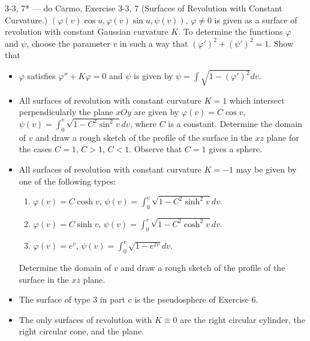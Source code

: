 \begin{exercise}{3-3, 7* — do Carmo, Exercise 3-3, 7}
(Surfaces of Revolution with Constant Curvature.) $(\varphi(v) \cos u, \varphi(v) \sin u, \psi(v))$, $\varphi \neq 0$ is given as a surface of revolution with constant Gaussian curvature $K$. To determine the functions $\varphi$ and $\psi$, choose the parameter $v$ in such a way that $(\varphi')^2 + (\psi')^2 = 1$. Show that
\begin{itemize}
\item[a.] $\varphi$ satisfies $\varphi'' + K\varphi = 0$ and $\psi$ is given by $\psi = \int \sqrt{1 - (\varphi')^2} dv$.
\item[b.] All surfaces of revolution with constant curvature $K = 1$ which intersect perpendicularly the plane $xOy$ are given by $\varphi (v) = C \cos v$, $\psi (v) = \int_ {0} ^ {v} \sqrt {1 - C ^ {2} \sin^ {2} v} d v$, where $C$ is a constant. Determine the domain of $v$ and draw a rough sketch of the profile of the surface in the $xz$ plane for the cases $C = 1$, $C > 1$, $C < 1$. Observe that $C = 1$ gives a sphere.
\item[c.] All surfaces of revolution with constant curvature $K = -1$ may be given by one of the following types:
\begin{enumerate}
\item $\varphi(v) = C \cosh v$, $\psi (v) = \int_ {0} ^ {v} \sqrt {1 - C ^ {2} \sinh^ {2} v} d v$.
\item $\varphi (v) = C\sinh v$, $\psi (v) = \int_ {0} ^ {v} \sqrt {1 - C ^ {2} \cosh^ {2} v} d v$.
\item $\varphi (v) = e^{v}$, $\psi (v) = \int_ {0} ^ {v} \sqrt {1 - e ^ {2 v}} d v$.
\end{enumerate}
Determine the domain of $v$ and draw a rough sketch of the profile of the surface in the $xz$ plane.
\item[d.] The surface of type 3 in part c is the pseudosphere of Exercise 6.
\item[e.] The only surfaces of revolution with $K \equiv 0$ are the right circular cylinder, the right circular cone, and the plane.
\end{itemize}
\end{exercise}

